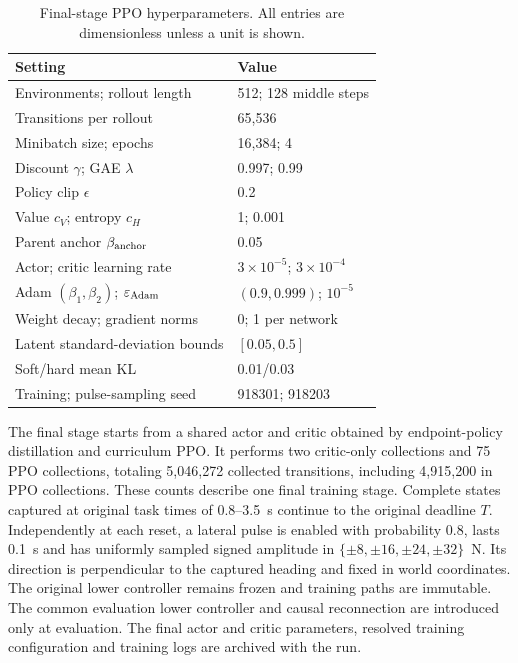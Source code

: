 \begin{table}[t]
\centering\small\setlength{\tabcolsep}{4pt}
\caption{Final-stage PPO hyperparameters. All entries are dimensionless unless a unit is shown.}
\label{tab:ppo}
\begin{tabular}{@{}ll@{}}
\toprule
Setting & Value\\
\midrule
Environments; rollout length & 512; 128 middle steps\\
Transitions per rollout & 65,536\\
Minibatch size; epochs & 16,384; 4\\
Discount $\gamma$; GAE $\lambda$ & 0.997; 0.99\\
Policy clip $\epsilon$ & 0.2\\
Value $c_V$; entropy $c_H$ & 1; 0.001\\
Parent anchor $\beta_{\rm anchor}$ & 0.05\\
Actor; critic learning rate & $3\!\times\!10^{-5}$; $3\!\times\!10^{-4}$\\
Adam $(\beta_1,\beta_2)$; $\varepsilon_{\rm Adam}$ & $(0.9,0.999)$; $10^{-5}$\\
Weight decay; gradient norms & 0; 1 per network\\
Latent standard-deviation bounds & $[0.05,0.5]$\\
Soft/hard mean KL & 0.01/0.03\\
Training; pulse-sampling seed & 918301; 918203\\
\bottomrule
\end{tabular}
\end{table}

The final stage starts from a shared actor and critic obtained by endpoint-policy distillation and curriculum PPO. It performs two critic-only collections and 75 PPO collections, totaling 5,046,272 collected transitions, including 4,915,200 in PPO collections. These counts describe one final training stage. Complete states captured at original task times of 0.8--3.5~s continue to the original deadline $T$. Independently at each reset, a lateral pulse is enabled with probability 0.8, lasts 0.1~s and has uniformly sampled signed amplitude in $\{\pm8,\pm16,\pm24,\pm32\}$~N. Its direction is perpendicular to the captured heading and fixed in world coordinates. The original lower controller remains frozen and training paths are immutable. The common evaluation lower controller and causal reconnection are introduced only at evaluation. The final actor and critic parameters, resolved training configuration and training logs are archived with the run.
